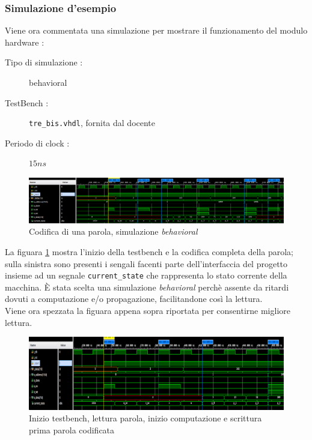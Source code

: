 \documentclass[11pt,a4paper]{article}
\begin{document}
            \subsubsection{Simulazione d'esempio}
                Viene ora commentata una simulazione per mostrare il funzionamento del modulo hardware :
                \begin{description}
                    \item[Tipo di simulazione : ] behavioral
                    \item[TestBench : ] \texttt{tre\_bis.vhdl}, fornita dal docente 
                    \item[Periodo di clock : ] $15ns$ 
                \end{description}
                \begin{figure}[h]
                    \centering
                    \includegraphics[width = \linewidth]{totale.png}
                    \caption{Codifica di una parola, simulazione \textit{behavioral}}
                    \label{behavioral_totale}
                \end{figure}
                La figuara \ref{behavioral_totale} mostra l'inizio della testbench e la codifica completa della parola; sulla sinistra sono presenti i sengali facenti parte dell'interfaccia del progetto insieme ad un segnale \texttt{current\_state} che rappresenta lo stato corrente della macchina.
                È stata scelta una simulazione \textit{behavioral} perchè assente da ritardi dovuti a computazione e/o propagazione, facilitandone così la lettura.\\
                Viene ora spezzata la figuara appena sopra riportata per consentirne migliore lettura.
                \begin{figure}[h]
                    \centering
                    \includegraphics[width = \linewidth]{primi_4_scaled.png}
                    \caption{Inizio testbench, lettura parola, inizio computazione e scrittura prima parola codificata}
                    \label{behavioral_primi_4}
                \end{figure}
\end{document}
